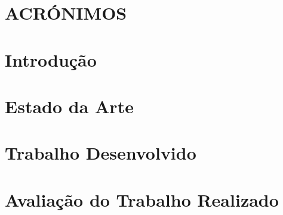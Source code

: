 \documentclass[a4paper, twoside, 12pt]{report}
\makeatletter
\renewcommand*{\cleardoublepage}{\clearpage\if@twoside \ifodd\c@page\else
\hbox{}%
\thispagestyle{empty}%
\newpage%
\if@twocolumn\hbox{}\newpage\fi\fi\fi}
\makeatother
\begin{document}
\chapter*{ACRÓNIMOS}

\thispagestyle{empty}
\mbox{}

\fancyhead[LE,RE]{\slshape\rightmark}
\fancyhead[LO,RO]{\slshape\leftmark}
\fancyhead[RE,LO]{}
\pagestyle{fancy}
\titleformat{\chapter}[display]
    {\normalfont\huge\bfseries}{\chaptertitlename\ \thechapter}{20pt}{\Huge}
\titlespacing*{\chapter}{0pt}{0pt}{20pt}

\chapter{Introdução}


\chapter{Estado da Arte}
\label{chap:state_of_the_art}


\clearpage \cleardoublepage %

\chapter{Trabalho Desenvolvido}\label{workcharp}


\chapter{Avaliação do Trabalho Realizado}\label{cap4}

\end{document}
